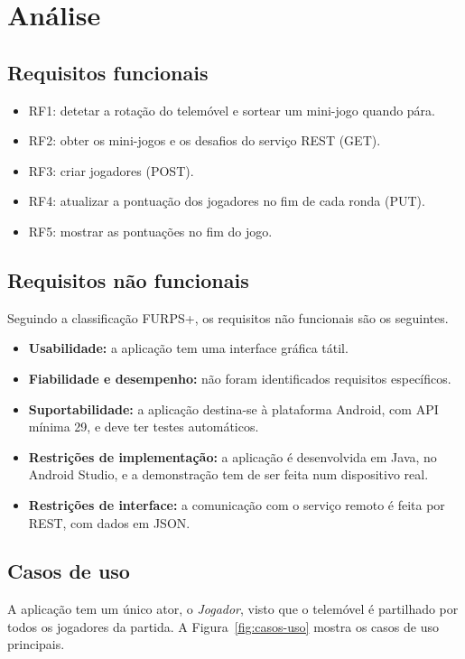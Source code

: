 \documentclass[runningheads,a4paper]{llncs}
\begin{document}
\section{Análise}
\subsection{Requisitos funcionais}
\begin{itemize}
\item RF1: detetar a rotação do telemóvel e sortear um mini-jogo quando pára.
\item RF2: obter os mini-jogos e os desafios do serviço REST (GET).
\item RF3: criar jogadores (POST).
\item RF4: atualizar a pontuação dos jogadores no fim de cada ronda (PUT).
\item RF5: mostrar as pontuações no fim do jogo.
\end{itemize}

\subsection{Requisitos não funcionais}
Seguindo a classificação FURPS+, os requisitos não funcionais são os seguintes.
\begin{itemize}
\item \textbf{Usabilidade:} a aplicação tem uma interface gráfica tátil.
\item \textbf{Fiabilidade e desempenho:} não foram identificados requisitos
específicos.
\item \textbf{Suportabilidade:} a aplicação destina-se à plataforma Android,
com API mínima 29, e deve ter testes automáticos.
\item \textbf{Restrições de implementação:} a aplicação é desenvolvida em Java,
no Android Studio, e a demonstração tem de ser feita num dispositivo real.
\item \textbf{Restrições de interface:} a comunicação com o serviço remoto é
feita por REST, com dados em JSON.
\end{itemize}

\subsection{Casos de uso}
A aplicação tem um único ator, o \emph{Jogador}, visto que o telemóvel é
partilhado por todos os jogadores da partida. A Figura~\ref{fig:casos-uso}
mostra os casos de uso principais.
\end{document}
